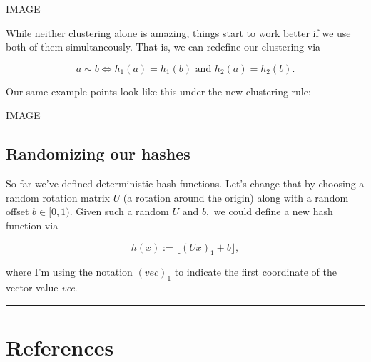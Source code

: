 \documentclass[20pt,]{extarticle}
\begin{document}
IMAGE

While neither clustering alone is amazing, things start to work better
if we use both of them simultaneously. That is, we can redefine our
clustering via

\[ a \sim b \iff h_1(a) = h_1(b) \text{ and } h_2(a) = h_2(b). \]

Our same example points look like this under the new clustering rule:

IMAGE

\subsection{Randomizing our hashes}\label{randomizing-our-hashes}

So far we've defined deterministic hash functions. Let's change that by
choosing a random rotation matrix \(U\) (a rotation around the origin)
along with a random offset \(b \in [0, 1).\) Given such a random \(U\)
and \(b,\) we could define a new hash function via

\[ h(x) := \lfloor (Ux)_1 + b \rfloor, \]

where I'm using the notation \(( \textit{vec} )_1\) to indicate the
first coordinate of the vector value \emph{vec}.

\begin{center}\rule{0.5\linewidth}{\linethickness}\end{center}

\section{References}\label{references}
\end{document}
